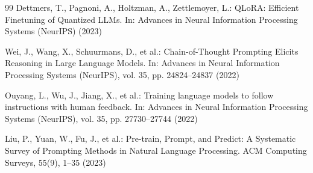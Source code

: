 \documentclass[runningheads]{llncs}
\begin{document}
\begin{thebibliography}{99}
Dettmers, T., Pagnoni, A., Holtzman, A., Zettlemoyer, L.: QLoRA: Efficient Finetuning of Quantized LLMs. In: Advances in Neural Information Processing Systems (NeurIPS) (2023)

Wei, J., Wang, X., Schuurmans, D., et al.: Chain-of-Thought Prompting Elicits Reasoning in Large Language Models. In: Advances in Neural Information Processing Systems (NeurIPS), vol. 35, pp. 24824--24837 (2022)

Ouyang, L., Wu, J., Jiang, X., et al.: Training language models to follow instructions with human feedback. In: Advances in Neural Information Processing Systems (NeurIPS), vol. 35, pp. 27730--27744 (2022)

Liu, P., Yuan, W., Fu, J., et al.: Pre-train, Prompt, and Predict: A Systematic Survey of Prompting Methods in Natural Language Processing. ACM Computing Surveys, 55(9), 1--35 (2023)

\end{thebibliography}
\end{document}
